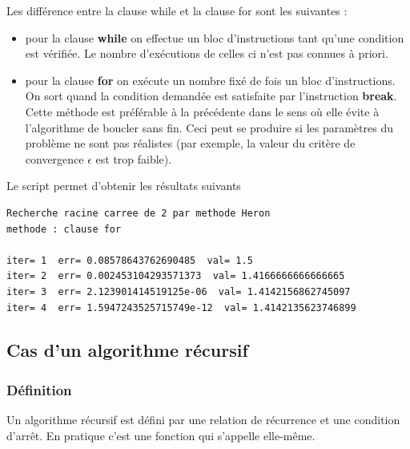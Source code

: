 \documentclass[a4paper,12pt]{article}
\begin{document}
\begin{leftbar}
Les différence  entre la clause while et la clause for sont les suivantes :
\begin{itemize}
\item pour la clause \textbf{while} on effectue un bloc  d'instructions tant qu'une condition est vérifiée. Le nombre d'exécutions de celles ci n'est pas connues à priori.
\item pour la clause \textbf{for} on exécute  un nombre fixé de fois un bloc  d'instructions. On sort quand la condition demandée est satisfaite par l'instruction \textbf{break}. Cette méthode est préférable à la précédente dans le sens où elle évite à l'algorithme de boucler sans fin. Ceci peut se produire si les paramètres du problème ne sont pas réalistes (par exemple, la valeur du critère de convergence $\epsilon$ est trop faible).
\end{itemize}
\end{leftbar}


Le script permet d'obtenir les résultats suivants
\begin{verbatim}
Recherche racine carree de 2 par methode Heron
methode : clause for

iter= 1  err= 0.08578643762690485  val= 1.5
iter= 2  err= 0.002453104293571373  val= 1.4166666666666665
iter= 3  err= 2.123901414519125e-06  val= 1.4142156862745097
iter= 4  err= 1.5947243525715749e-12  val= 1.4142135623746899
\end{verbatim} 

\clearpage  
\subsection{Cas d'un algorithme r\'ecursif}
\subsubsection{Définition}
\begin{leftbar}
Un algorithme r\'ecursif est d\'efini par une relation de r\'ecurrence et une condition d'arr\^et. En pratique c'est une fonction qui s'appelle elle-m\^eme.
\end{leftbar}
\end{document}
